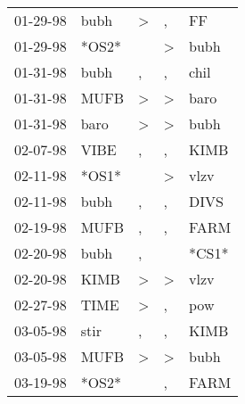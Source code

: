 \begin{supertabular}{p{0.07\textwidth}p{0.06\textwidth}p{0.02\textwidth}p{0.02\textwidth}p{0.06\textwidth}}
          01-29-98\textsuperscript{} &  bubh\textsuperscript{} &  \textgreater &                , &    FF\textsuperscript{} \\
          01-29-98\textsuperscript{} &                   *OS2* &               &     \textgreater &  bubh\textsuperscript{} \\
          01-31-98\textsuperscript{} &  bubh\textsuperscript{} &             , &                , &  chil\textsuperscript{} \\
          01-31-98\textsuperscript{} &  MUFB\textsuperscript{} &  \textgreater &     \textgreater &  baro\textsuperscript{} \\
          01-31-98\textsuperscript{} &  baro\textsuperscript{} &  \textgreater &     \textgreater &  bubh\textsuperscript{} \\
          02-07-98\textsuperscript{} &  VIBE\textsuperscript{} &             , &                , &  KIMB\textsuperscript{} \\
          02-11-98\textsuperscript{} &                   *OS1* &               &     \textgreater &  vlzv\textsuperscript{} \\
          02-11-98\textsuperscript{} &  bubh\textsuperscript{} &             , &                , &  DIVS\textsuperscript{} \\
          02-19-98\textsuperscript{} &  MUFB\textsuperscript{} &             , &                , &  FARM\textsuperscript{} \\
          02-20-98\textsuperscript{} &  bubh\textsuperscript{} &             , &                  &                   *CS1* \\
          02-20-98\textsuperscript{} &  KIMB\textsuperscript{} &  \textgreater &     \textgreater &  vlzv\textsuperscript{} \\
          02-27-98\textsuperscript{} &  TIME\textsuperscript{} &  \textgreater &                , &   pow\textsuperscript{} \\
          03-05-98\textsuperscript{} &  stir\textsuperscript{} &             , &                , &  KIMB\textsuperscript{} \\
          03-05-98\textsuperscript{} &  MUFB\textsuperscript{} &  \textgreater &     \textgreater &  bubh\textsuperscript{} \\
          03-19-98\textsuperscript{} &                   *OS2* &               &                , &  FARM\textsuperscript{} \\

\end{supertabular}
